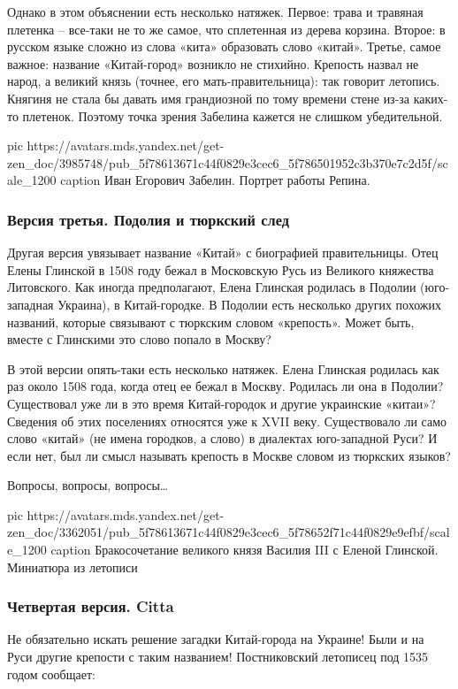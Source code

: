 Однако в этом объяснении есть несколько натяжек. Первое: трава и травяная
плетенка – все-таки не то же самое, что сплетенная из дерева корзина. Второе: в
русском языке сложно из слова «кита» образовать слово «китай». Третье, самое
важное: название «Китай-город» возникло не стихийно. Крепость назвал не народ,
а великий князь (точнее, его мать-правительница): так говорит летопись. Княгиня
не стала бы давать имя грандиозной по тому времени стене из-за каких-то
плетенок. Поэтому точка зрения Забелина кажется не слишком убедительной.

\ifcmt
pic https://avatars.mds.yandex.net/get-zen_doc/3985748/pub_5f78613671c44f0829e3cec6_5f786501952c3b370e7c2d5f/scale_1200
caption Иван Егорович Забелин. Портрет работы Репина.
\fi

\subsubsection{Версия третья. Подолия и тюркский след}

Другая версия увязывает название «Китай» с биографией правительницы. Отец Елены
Глинской в 1508 году бежал в Московскую Русь из Великого княжества Литовского.
Как иногда предполагают, Елена Глинская родилась в Подолии (юго-западная
Украина), в Китай-городке. В Подолии есть несколько других похожих названий,
которые связывают с тюркским словом «крепость». Может быть, вместе с Глинскими
это слово попало в Москву?

В этой версии опять-таки есть несколько натяжек. Елена Глинская родилась как
раз около 1508 года, когда отец ее бежал в Москву. Родилась ли она в Подолии?
Существовал уже ли в это время Китай-городок и другие украинские «китаи»?
Сведения об этих поселениях относятся уже к XVII веку. Существовало ли само
слово «китай» (не имена городков, а слово) в диалектах юго-западной Руси? И
если нет, был ли смысл называть крепость в Москве словом из тюркских языков?

Вопросы, вопросы, вопросы…

\ifcmt
pic https://avatars.mds.yandex.net/get-zen_doc/3362051/pub_5f78613671c44f0829e3cec6_5f78652f71c44f0829e9efbf/scale_1200
caption Бракосочетание великого князя Василия III с Еленой Глинской. Миниатюра из летописи
\fi

\subsubsection{Четвертая версия. Citta}

Не обязательно искать решение загадки Китай-города на Украине! Были и на Руси
другие крепости с таким названием! Постниковский летописец под 1535 годом
сообщает:

